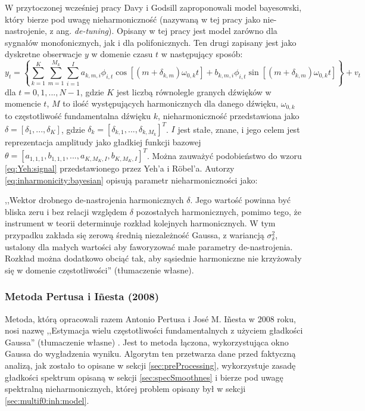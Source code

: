 \documentclass[12pt,a4paper,twoside]{mwart}
\begin{document}
W przytoczonej wcześniej pracy 
\cite[1-10]{Transcription:BayesianHarmonicModels}
 Davy i Godsill zaproponowali model bayesowski, który bierze pod uwagę nieharmoniczność (nazywaną w tej pracy jako nie-nastrojenie, z ang. \textit{de-tuning}). Opisany w tej pracy jest model zarówno dla sygnałów monofonicznych, jak i dla polifonicznych. Ten drugi zapisany jest jako dyskretne obserwacje $y$ w domenie czasu $t$ w następujący sposób:
\begin{equation}\label{eq:inharmonicity:bayesian}
  y_t = \left\{ \sum_{k=1}^{K}\sum_{m=1}^{M_k}\sum_{i=1}^{I} a_{k,m,i} \phi_{i,t}\cos[(m + \delta_{k,m})\omega_{0,k}t] + b_{k,m,i}\phi_{i,t}\sin[(m + \delta_{k,m})\omega_{0,k}t]\right\} + v_t
\end{equation}
dla $t = 0,1,...,N-1$, gdzie $K$ jest liczbą równolegle granych dźwięków w momencie $t$, $M$ to ilość występujących harmonicznych dla danego dźwięku, $\omega_{0,k}$ to częstotliwość fundamentalna dźwięku $k$, nieharmoniczność przedstawiona jako $\delta = [\delta_1, ..., \delta_K]$, gdzie $\delta_k = [\delta_{k,1}, ..., \delta_{k, M_{k}}]^T$. $I$ jest stałe, znane, i jego celem jest reprezentacja amplitudy jako gładkiej funkcji bazowej $\theta = [a_{1,1,1}, b_{1,1,1}, ..., a_{K, M_{K},I}, b_{K, M_{K},I}]^T$. Można zauważyć podobieństwo do wzoru  \ref{eq:Yeh:signal} przedstawionego przez Yeh'a i Röbel'a. Autorzy \ref{eq:inharmonicity:bayesian} opisują parametr nieharmoniczności jako:
\begin{displayquote}
,,Wektor drobnego de-nastrojenia harmonicznych $\delta$. Jego wartość powinna być bliska zeru i bez relacji względem $\delta$ pozostałych harmonicznych, pomimo tego, że instrument w teorii determinuje rozkład kolejnych harmonicznych. W tym przypadku zakłada się zerową średnią niezależność Gaussa, z wariancją $\sigma_{\delta}^{2}$, ustalony dla małych wartości aby faworyzować małe parametry de-nastrojenia. Rozkład można dodatkowo obciąć tak, aby sąsiednie harmoniczne nie krzyżowały się w domenie częstotliwości'' 
\cite[9]{Transcription:BayesianHarmonicModels}
(tłumaczenie własne).
\end{displayquote}
\subsubsection{Metoda Pertusa i Iñesta (2008)} \label{sec:pertus1}
Metoda, którą opracowali razem Antonio Pertusa i José M. Iñesta w 2008 roku, nosi nazwę ,,Estymacja wielu częstotliwości fundamentalnych z użyciem gładkości Gaussa'' (tłumaczenie własne) \cite{Transcription:Pertus:Inharmonicity}. Jest to metoda łączona, wykorzystująca okno Gaussa do wygładzenia wyniku. Algorytm ten przetwarza dane przed faktyczną analizą, jak zostało to opisane w sekcji \ref{sec:preProcessing}, wykorzystuje zasadę gładkości spektrum opisaną w sekcji \ref{sec:specSmoothnes} i bierze pod uwagę spektralną nieharmonicznych, której problem opisany był w sekcji \ref{sec:multif0:inh:model}.
\end{document}

